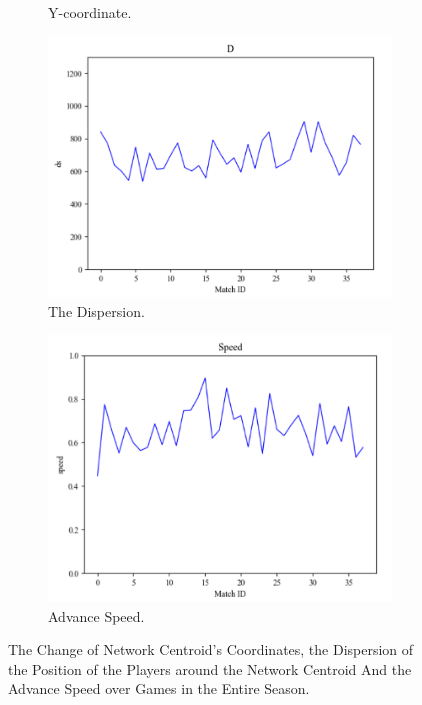 \documentclass{mcmthesis}
\begin{document}
\begin{figure}[h]
\begin{subfigure}[b]{0.24\textwidth}
			\caption{Y-coordinate.}
			\label{fig:y2}
		\end{subfigure}
		\begin{subfigure}[b]{0.24\textwidth}
			\includegraphics[width=\textwidth]{figures/d2.png}
			\caption{The Dispersion.}
			\label{fig:d2}
		\end{subfigure}
		\begin{subfigure}[b]{0.24\textwidth}
			\includegraphics[width=\textwidth]{figures/s2.png}
			\caption{Advance Speed.}
			\label{fig:s2}
		\end{subfigure}
		\caption{The Change of Network Centroid's Coordinates, the Dispersion of the Position of the Players around the Network Centroid And the Advance Speed over Games in the Entire Season.}\label{fig:season}
	\end{figure}
\end{document}

